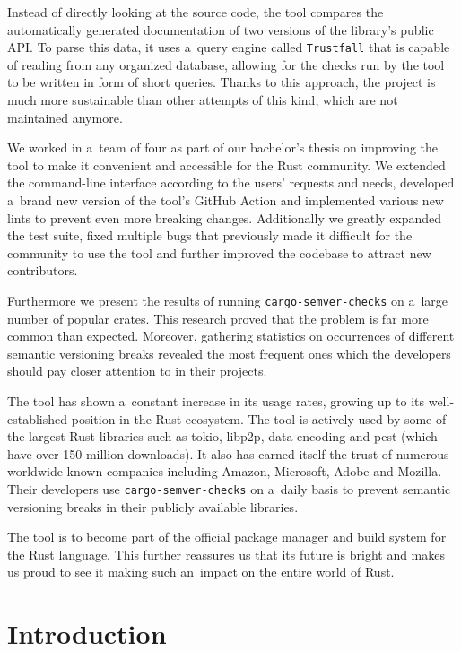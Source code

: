 \documentclass[licencjacka,en]{pracamgr}
\begin{document}
Instead of directly looking at the source code, the tool compares the automatically generated
documentation of two versions of the library's public API. To parse this data, it uses
a~query engine called \texttt{Trustfall} that is capable of reading from any organized database,
allowing for the checks run by the tool to be written in form of short queries. Thanks to
this approach, the project is much more sustainable than other attempts of this kind,
which are not maintained anymore.

We worked in a~team of four as part of our bachelor's thesis on improving the tool to make it
convenient and accessible for the Rust community. We extended the command-line interface
according to the users' requests and needs, developed a~brand new version of
the tool's GitHub Action and implemented various new lints to prevent even more breaking changes.
Additionally we greatly expanded the test suite, fixed multiple bugs that previously
made it difficult for the community to use the tool and further improved the codebase to attract
new contributors.

Furthermore we present the results of running \texttt{cargo-semver-checks} on a~large number
of popular crates. This research proved that the problem is far more common than expected.
Moreover, gathering statistics on occurrences of different semantic versioning breaks
revealed the most frequent ones which the developers should pay closer attention to
in their projects.

The tool has shown a~constant increase in its usage rates, growing up to its
well-established position in the Rust ecosystem. The tool is actively used by some of
the largest Rust libraries such as tokio, libp2p, data-encoding and pest (which have
over 150 million downloads). It also has earned itself the trust of numerous worldwide
known companies including Amazon, Microsoft, Adobe and Mozilla. Their developers
use \texttt{cargo-semver-checks} on a~daily basis to prevent semantic versioning breaks in their
publicly available libraries.

The tool is to become part of the official package manager and build system for the Rust language.
This further reassures us that its future is bright and makes us proud to see it making
such an~impact on the entire world of Rust.



\chapter*{Introduction}
\end{document}
